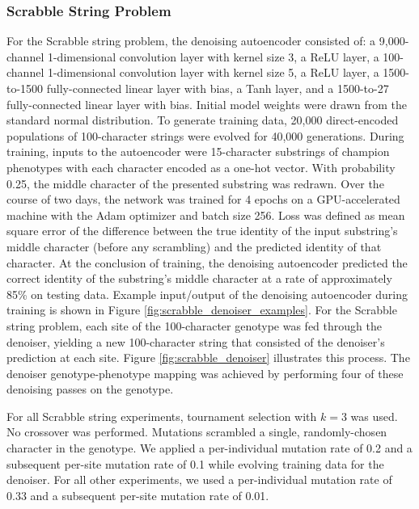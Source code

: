 \subsubsection{Scrabble String Problem}




For the Scrabble string problem, the denoising autoencoder consisted of: a 9,000-channel 1-dimensional convolution layer with kernel size 3, a ReLU layer, a 100-channel 1-dimensional convolution layer with kernel size 5, a ReLU layer, a 1500-to-1500 fully-connected linear layer with bias, a Tanh layer, and a 1500-to-27 fully-connected linear layer with bias.
Initial model weights were drawn from the standard normal distribution.
To generate training data, 20,000 direct-encoded populations of 100-character strings were evolved for 40,000 generations.
During training, inputs to the autoencoder were 15-character substrings of champion phenotypes with each character encoded as a one-hot vector.
With probability 0.25, the middle character of the presented substring was redrawn.
Over the course of two days, the network was trained for 4 epochs on a GPU-accelerated machine with the Adam optimizer and batch size 256.
Loss was defined as mean square error of the difference between the true identity of the input substring's middle character (before any scrambling) and the predicted identity of that character.
At the conclusion of training, the denoising autoencoder predicted the correct identity of the substring's middle character at a rate of approximately 85\% on testing data.
Example input/output of the denoising autoencoder during training is shown in Figure \ref{fig:scrabble_denoiser_examples}.
For the Scrabble string problem, each site of the 100-character genotype was fed through the denoiser, yielding a new 100-character string that consisted of the denoiser's prediction at each site.
Figure \ref{fig:scrabble_denoiser} illustrates this process.
The denoiser genotype-phenotype mapping was achieved by performing four of these denoising passes on the genotype.

For all Scrabble string experiments, tournament selection with $k = 3$ was used.
No crossover was performed.
Mutations scrambled a single, randomly-chosen character in the genotype.
We applied a per-individual mutation rate of 0.2 and a subsequent per-site mutation rate of 0.1 while evolving training data for the denoiser.
For all other experiments, we used a per-individual mutation rate of 0.33 and a subsequent per-site mutation rate of 0.01.

